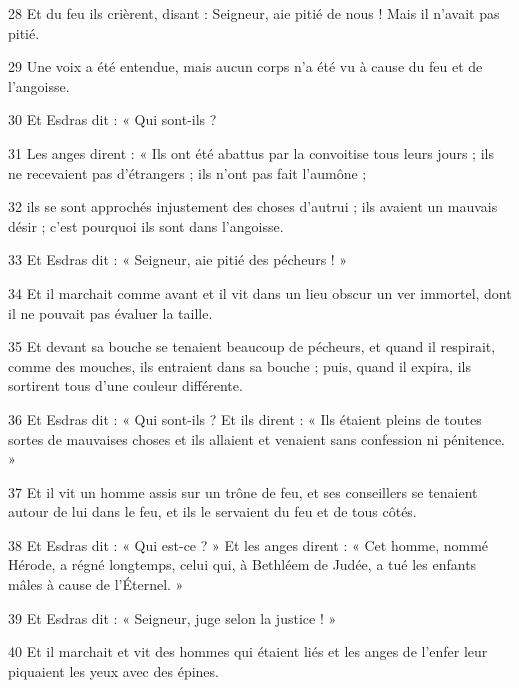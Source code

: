 \par 28 Et du feu ils crièrent, disant : Seigneur, aie pitié de nous ! Mais il n'avait pas pitié.

\par 29 Une voix a été entendue, mais aucun corps n'a été vu à cause du feu et de l'angoisse.

\par 30 Et Esdras dit : « Qui sont-ils ?

\par 31 Les anges dirent : « Ils ont été abattus par la convoitise tous leurs jours ; ils ne recevaient pas d'étrangers ; ils n'ont pas fait l'aumône ;

\par 32 ils se sont approchés injustement des choses d'autrui ; ils avaient un mauvais désir ; c’est pourquoi ils sont dans l’angoisse.

\par 33 Et Esdras dit : « Seigneur, aie pitié des pécheurs ! »

\par 34 Et il marchait comme avant et il vit dans un lieu obscur un ver immortel, dont il ne pouvait pas évaluer la taille.

\par 35 Et devant sa bouche se tenaient beaucoup de pécheurs, et quand il respirait, comme des mouches, ils entraient dans sa bouche ; puis, quand il expira, ils sortirent tous d’une couleur différente.

\par 36 Et Esdras dit : « Qui sont-ils ? Et ils dirent : « Ils étaient pleins de toutes sortes de mauvaises choses et ils allaient et venaient sans confession ni pénitence. »

\par 37 Et il vit un homme assis sur un trône de feu, et ses conseillers se tenaient autour de lui dans le feu, et ils le servaient du feu et de tous côtés.

\par 38 Et Esdras dit : « Qui est-ce ? » Et les anges dirent : « Cet homme, nommé Hérode, a régné longtemps, celui qui, à Bethléem de Judée, a tué les enfants mâles à cause de l'Éternel. »

\par 39 Et Esdras dit : « Seigneur, juge selon la justice ! »

\par 40 Et il marchait et vit des hommes qui étaient liés et les anges de l'enfer leur piquaient les yeux avec des épines.


